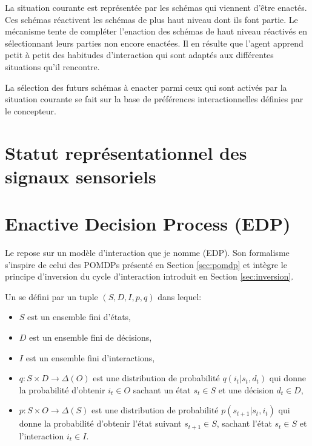 La situation courante est représentée par les schémas qui viennent d'être enactés. 
Ces schémas réactivent les schémas de plus haut niveau dont ils font partie. 
Le mécanisme tente de compléter l'enaction des schémas de haut niveau réactivés en sélectionnant leurs parties non encore enactées.
Il en résulte que l'agent apprend petit à petit des habitudes d'interaction qui sont adaptés aux différentes situations qu'il rencontre. 

La sélection des futurs schémas à enacter parmi ceux qui sont activés par la situation courante se fait sur la base de préférences interactionnelles définies par le concepteur. 

\section{Statut représentationnel des signaux sensoriels}




\section{Enactive Decision Process (EDP)}
\label{sec:edp}

\noindent
Le  repose sur un modèle d'interaction que je nomme  (EDP).
Son formalisme s'inspire de celui des POMDPs présenté en Section \ref{sec:pomdp} et intègre le principe d'inversion du cycle d'interaction introduit en Section \ref{sec:inversion}.


Un  se défini par un tuple $(S, D, I, p, q)$ dans lequel:

\begin{itemize}[label=\scalebox{.85}{$\diamond$}]
	\item $S$ est un ensemble fini d'états,
	\item $D$ est un ensemble fini de décisions,
	\item $I$ est un ensemble fini d'interactions,
	\item $q: S\times D \to \Delta(O)$ est une distribution de probabilité $q(i_t|s_t,d_t)$ qui donne la probabilité d'obtenir $i_t \in O$ sachant un état $s_t \in S$ et une décision $d_t \in D$,
	\item $p:S\times O\to \Delta(S)$ est une distribution de probabilité $p(s_{t+1}|s_t,i_t)$ qui donne la probabilité d'obtenir l'état suivant $s_{t+1} \in S$, sachant l'état $s_t \in S$ et l'interaction $i_t \in I$.
\end{itemize}


